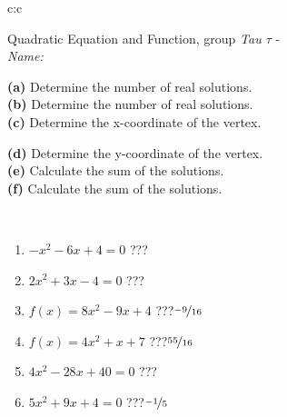 \documentclass[10pt]{report}
\begin{document}
\begin{tabular}{c:c}
\begin{minipage}[c][104.5mm][t]{0.5\linewidth}
\begin{center}
\vspace{7mm}
{\huge {\LARGE Quadratic Equation and Function}, group \textit{Tau $\tau$} -}\\[5mm]
\textit{Name:}\phantom{xxxxxxxxxxxxxxxxxxxxxxxxxxxxxxxxxxxxxxxxxxxxxxxxxxxxxxxxxxxxxxxxx}\\[5mm]
\begin{minipage}{0.95\linewidth}
\begin{center}
{\small \begin{minipage}{0.5\textwidth}
\textbf{(a)} Determine the number of real solutions. \\[1mm]
\textbf{(b)} Determine the number of real solutions. \\[1mm]
\textbf{(c)} Determine the x-coordinate of the vertex.
\end{minipage} \begin{minipage}{0.49\textwidth}
\textbf{(d)} Determine the y-coordinate of the vertex. \\[1mm]
\textbf{(e)} Calculate the sum of the solutions. \\[1mm]
\textbf{(f)} Calculate the sum of the solutions.
\end{minipage}
}
\end{center}
\end{minipage}
\\[4mm]
\begin{minipage}{0.79\linewidth}
\begin{center}
\begin{varwidth}{\linewidth}
\begin{enumerate}
\Large
\item $-x^2-6x+4=0$\quad \dotfill\; ???\;\dotfill {}
\item $2x^2+3x-4=0$\quad \dotfill\; ???\;\dotfill {}
\item $f(x)=8x^2-9x+4$\quad \dotfill\; ???\;\dotfill \quad $\nicefrac{-9}{16}$
\item $f(x)=4x^2+x+7$\quad \dotfill\; ???\;\dotfill \quad $\nicefrac{55}{16}$
\item $4x^2-28x+40=0$\quad \dotfill\; ???\;\dotfill {}
\item $5x^2+9x+4=0$\quad \dotfill\; ???\;\dotfill \quad $\nicefrac{-1}{5}$
\end{enumerate}
\end{varwidth}

\end{center}
\end{minipage}
\end{center}
\end{minipage}
\end{tabular}
\end{document}
